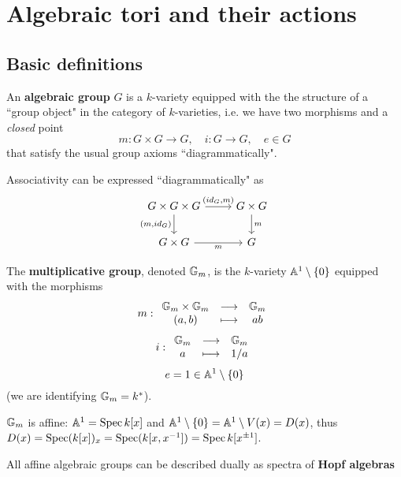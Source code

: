 \chapter{Algebraic tori and their actions}

\section{Basic definitions}
\begin{definition}
An \textbf{algebraic group} $G$ is a $k$-variety equipped with the the structure of a ``group object" in the category of $k$-varieties, i.e. we have two morphisms and a \textit{closed} point
\[m:G\times G\to G,\quad i:G\to G,\quad e\in G\]
that satisfy the usual group axioms ``diagrammatically".
\end{definition}

\begin{example}
Associativity can be expressed ``diagrammatically" as
\[\begin{tikzcd}
	{G\times G\times G} & {G\times G} \\
	{G\times G} & G
	\arrow["{(id_G,m)}", from=1-1, to=1-2]
	\arrow["{(m,id_G)}"', from=1-1, to=2-1]
	\arrow["m", from=1-2, to=2-2]
	\arrow["m"', from=2-1, to=2-2]
\end{tikzcd}\]
\end{example}

\begin{definition}
The \textbf{multiplicative group}, denoted $\mathbb{G}_m$, is the $k$-variety $\mathbb{A}^1\setminus \left\{{0}\right\}$ equipped with the morphisms
\[m:\begin{array}{ccc} {\mathbb{G}_m\times \mathbb{G}_m} & \longrightarrow & {\mathbb{G}_m}\\ {(a,b)} & \longmapsto & {ab} \end{array}\]
\[i:\begin{array}{ccc} {\mathbb{G}_m} & \longrightarrow & {\mathbb{G}_m}\\ {a} & \longmapsto & {1/a} \end{array}\]
\[e=1\in \mathbb{A}^1\setminus\{0\}\]
(we are identifying $\mathbb{G}_m=k^\ast$).
\end{definition}

\begin{remark}
$\mathbb{G}_m$ is affine: $\mathbb{A}^1=\operatorname{Spec} k[x]$ and $\mathbb{A}^1\setminus\{0\}=\mathbb{A}^1\setminus V(x)=D(x)$, thus $D(x)=\operatorname{Spec} (k[x])_{x}=\operatorname{Spec}(k[x,x^{-1}])=\operatorname{Spec} k[x^{\pm1}]$.
\end{remark}

\begin{remark}
All affine algebraic groups can be described dually as spectra of \textbf{Hopf algebras}
\end{remark}


